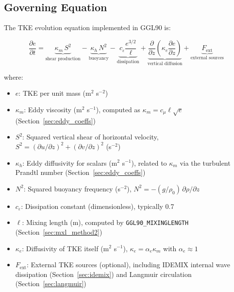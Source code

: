 \documentclass[12pt,letterpaper]{article}
\begin{document}
\subsection{Governing Equation}
\label{sec:tke_governing}

The TKE evolution equation implemented in GGL90 is:

\begin{equation}
\frac{\partial e}{\partial t} = \underbrace{\kappa_m \, S^2}_{\text{shear production}}
- \underbrace{\kappa_h \, N^2}_{\text{buoyancy}}
- \underbrace{c_\varepsilon \frac{e^{3/2}}{\ell}}_{\text{dissipation}}
+ \underbrace{\frac{\partial}{\partial z} \left( \kappa_e \frac{\partial e}{\partial z} \right)}_{\text{vertical diffusion}}
+ \underbrace{F_{\text{ext}}}_{\text{external sources}}
\label{eq:tke_budget}
\end{equation}

where:
\begin{itemize}
\item $e$: TKE per unit mass (m$^2$ s$^{-2}$)
\item $\kappa_m$: Eddy viscosity (m$^2$ s$^{-1}$), computed as $\kappa_m = c_\mu \ell \sqrt{e}$ (Section~\ref{sec:eddy_coeffs})
\item $S^2$: Squared vertical shear of horizontal velocity, $S^2 = ({\partial u}/{\partial z})^2 + ({\partial v}/{\partial z})^2$ (s$^{-2}$)
\item $\kappa_h$: Eddy diffusivity for scalars (m$^2$ s$^{-1}$), related to $\kappa_m$ via the turbulent Prandtl number (Section~\ref{sec:eddy_coeffs})
\item $N^2$: Squared buoyancy frequency (s$^{-2}$), $N^2 = -(g/\rho_0) \, \partial\rho/\partial z$
\item $c_\varepsilon$: Dissipation constant (dimensionless), typically 0.7
\item $\ell$: Mixing length (m), computed by \verb|GGL90_MIXINGLENGTH| (Section~\ref{sec:mxl_method2})
\item $\kappa_e$: Diffusivity of TKE itself (m$^2$ s$^{-1}$), $\kappa_e = \alpha_e \kappa_m$ with $\alpha_e \approx 1$
\item $F_{\text{ext}}$: External TKE sources (optional), including IDEMIX internal wave dissipation (Section~\ref{sec:idemix}) and Langmuir circulation (Section~\ref{sec:langmuir})
\end{itemize}
\end{document}
